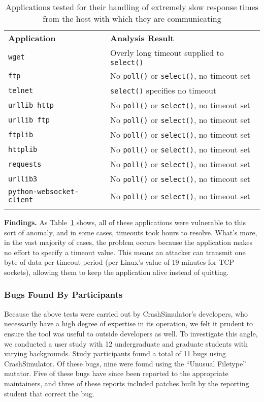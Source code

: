 \begin{table}[t]
  \scriptsize{}
  \begin{tabular}{l | l}
    \toprule{}
    {\bf Application}              & {\bf Analysis Result}\\
    {\tt wget}                     & Overly long timeout supplied to {\tt select()} \\
    {\tt ftp}                      & No {\tt poll()} or {\tt select()}, no timeout set \\
    {\tt telnet}                   & {\tt select()} specifies no timeout \\
    {\tt urllib http}              & No {\tt poll()} or {\tt select()}, no timeout set \\
    {\tt urllib ftp}               & No {\tt poll()} or {\tt select()}, no timeout set \\
    {\tt ftplib}                   & No {\tt poll()} or {\tt select()}, no timeout set \\
    {\tt httplib}                  & No {\tt poll()} or {\tt select()}, no timeout set \\
    {\tt requests}                 & No {\tt poll()} or {\tt select()}, no timeout set \\
    {\tt urllib3}                  & No {\tt poll()} or {\tt select()}, no timeout set \\
    {\tt python-websocket-client}  & No {\tt poll()} or {\tt select()}, no timeout set \\
    \bottomrule{}
  \end{tabular}
  \caption{Applications tested for their handling of extremely slow response
    times from the host with which they are communicating }
  \label{table:slowloris}
\end{table}


{\bf Findings.}
As Table~\ref{table:slowloris} shows, all of these
applications were vulnerable to this sort of anomaly,
and in some cases,
timeouts took hours to resolve.
What's more, in the vast majority of
cases, the problem occurs because the application makes no effort to
specify a timeout value.  This means an attacker can transmit one byte of
data per timeout period (per Linux's value of 19 minutes for TCP sockets),
allowing them to keep the application alive instead of quitting.

\subsubsection{Bugs Found By Participants}
Because the above tests were carried out by CrashSimulator's developers,
who necessarily have a high degree of expertise in its operation,
we felt it prudent to ensure the tool was useful
to outside developers as well.
To investigate this angle,
we conducted a user study
with 12 undergraduate and graduate students with varying backgrounds.
Study participants found a total of 11 bugs using CrashSimulator.
Of these bugs, nine were found using the ``Unusual Filetype'' mutator.
Five of these bugs have since been reported to the appropriate maintainers,
and three of these reports included patches built by the reporting student
that correct the bug.

